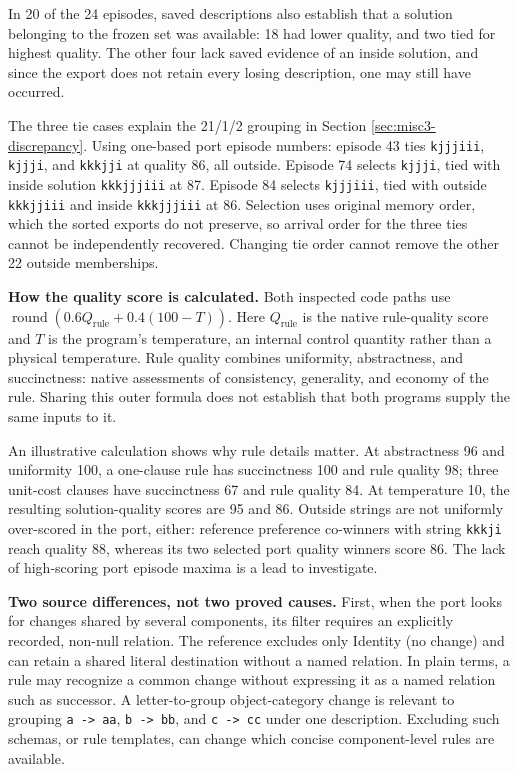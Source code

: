 \documentclass[10pt,letterpaper]{article}
\begin{document}
In 20 of the 24 episodes, saved descriptions also establish that a solution belonging to
the frozen set was available: 18 had lower quality, and two tied for highest quality. The
other four lack saved evidence of an inside solution, and since the export does not retain
every losing description, one may still have occurred.

The three tie cases explain the 21/1/2 grouping in Section \ref{sec:misc3-discrepancy}.
Using one-based port episode numbers: episode 43 ties \texttt{kjjjiii}, \texttt{kjjji},
and \texttt{kkkjji} at quality 86, all outside. Episode 74 selects \texttt{kjjji}, tied
with inside solution \texttt{kkkjjjiii} at 87. Episode 84 selects \texttt{kjjjiii}, tied
with outside \texttt{kkkjjiii} and inside \texttt{kkkjjjiii} at 86. Selection uses
original memory order, which the sorted exports do not preserve, so arrival order for the
three ties cannot be independently recovered. Changing tie order cannot remove the other
22 outside memberships.

\textbf{How the quality score is calculated.} Both inspected code paths use
\(\operatorname{round}(0.6 Q_{\mathrm{rule}}+0.4(100-T))\). Here \(Q_{\mathrm{rule}}\) is
the native rule-quality score and \(T\) is the program's temperature, an internal control
quantity rather than a physical temperature. Rule quality combines uniformity,
abstractness, and succinctness: native assessments of consistency, generality, and economy
of the rule. Sharing this outer formula does not establish that both programs supply the
same inputs to it.

An illustrative calculation shows why rule details matter. At abstractness 96 and
uniformity 100, a one-clause rule has succinctness 100 and rule quality 98; three
unit-cost clauses have succinctness 67 and rule quality 84. At temperature 10, the
resulting solution-quality scores are 95 and 86. Outside strings are not uniformly
over-scored in the port, either: reference preference co-winners with string
\texttt{kkkji} reach quality 88, whereas its two selected port quality winners score 86.
The lack of high-scoring port episode maxima is a lead to investigate.

\textbf{Two source differences, not two proved causes.} First, when the port looks for
changes shared by several components, its filter requires an explicitly recorded, non-null
relation. The reference excludes only Identity (no change) and can retain a shared literal
destination without a named relation. In plain terms, a rule may recognize a common change
without expressing it as a named relation such as successor. A letter-to-group
object-category change is relevant to grouping \texttt{a\ -\textgreater{}\ aa},
\texttt{b\ -\textgreater{}\ bb}, and \texttt{c\ -\textgreater{}\ cc} under one
description. Excluding such schemas, or rule templates, can change which concise
component-level rules are available.
\end{document}
